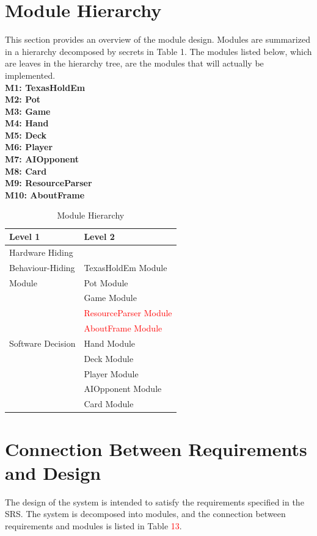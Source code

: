 \documentclass[11pt]{article}
\newcommand{\head}[1]{\textnormal{\textbf{#1}}}
\begin{document}
    \section{Module Hierarchy}
    This section provides an overview of the module design. Modules are summarized in a hierarchy decomposed by secrets in Table 1. The modules listed below, which are leaves in the hierarchy tree, are the modules that will actually be implemented.\\
    \textbf{M1: TexasHoldEm}\\
    \textbf{M2: Pot}\\
    \textbf{M3: Game}\\
    \textbf{M4: Hand}\\
    \textbf{M5: Deck}\\
    \textbf{M6: Player}\\
    \textbf{M7: AIOpponent}\\
    \textbf{M8: Card}\\
    \textbf{M9: ResourceParser}\\
    \textbf{M10: AboutFrame}\\
    \begin{table}[h]
    \caption{Module Hierarchy}
    \begin{tabular}{p{4cm}p{5cm}}
    \head{Level 1} & \head{Level 2} \\
    \hline
    Hardware Hiding & \\
    \hline
    Behaviour-Hiding  & TexasHoldEm Module \\
    Module & Pot Module\\
     & Game Module\\
     & \textcolor{red}{ResourceParser Module}\\           	 & \textcolor{red}{AboutFrame Module}\\
    \hline
    Software Decision & Hand Module  \\
     & Deck Module\\
     & Player Module \\
     & AIOpponent Module\\
     & Card Module\\
    \hline
    \end{tabular}
    \end{table}
	
	\section{Connection Between Requirements and Design}
    The design of the system is intended to satisfy the requirements specified in the SRS. The system is decomposed into modules, and the connection between requirements and modules is listed in Table \textcolor{red}{13}.
\end{document}
